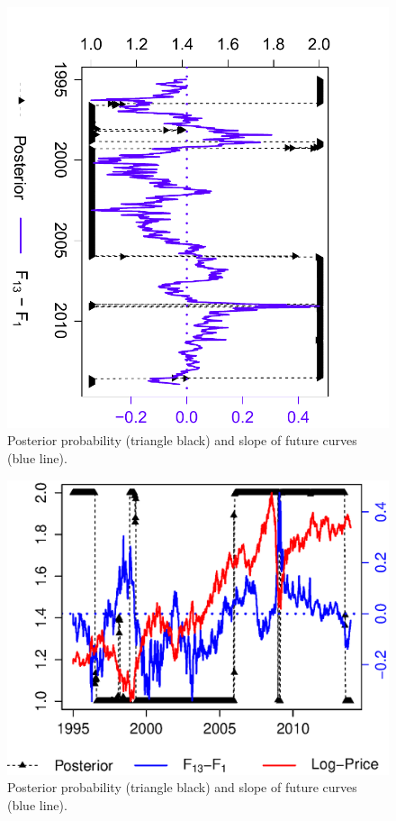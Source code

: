 \documentclass[nolayout]{article}
\theoremstyle{plain}
\theoremstyle{definition}
\newcommand{\1}{\mathbbm{1}}
\begin{document}
\begin{figure}
	\centering
	\includegraphics[scale=.75,angle=90]{Posterior_Data}
	\caption{Posterior probability (triangle black) and slope of future curves (blue line).}
	\label{fig:posterior:data}
\end{figure}

\begin{figure}
	\centering
	\includegraphics[scale=.75]{Posterior_Data_LogPrice}
	\caption{Posterior probability (triangle black) and slope of future curves (blue line).}
	\label{fig:posterior:data:logprice}
\end{figure}
\end{document}
